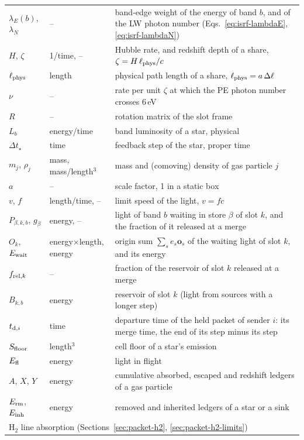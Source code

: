 \begin{longtable}{p{1.9cm}p{3.4cm}p{8.6cm}}
$\lambda_E(b)$, $\lambda_N$ & -- & band-edge weight of the energy of band $b$, and of the LW photon number (Eqs.~\eqref{eq:isrf-lambdaE}, \eqref{eq:isrf-lambdaN}) \\
$H$, $\zeta$ & 1/time, -- & Hubble rate, and redshift depth of a share, $\zeta=H\,\ell_{\rm phys}/c$ \\
$\ell_{\rm phys}$ & length & physical path length of a share, $\ell_{\rm phys}=a\,\Delta\ell$ \\
$\nu$ & -- & rate per unit $\zeta$ at which the PE photon number crosses $6$\,eV \\
$R$ & -- & rotation matrix of the slot frame \\
$L_b$ & energy/time & band luminosity of a star, physical \\
$\Delta t_\star$ & time & feedback step of the star, proper time \\
$m_j$, $\rho_j$ & mass, mass/length$^3$ & mass and (comoving) density of gas particle $j$ \\
$a$ & -- & scale factor, 1 in a static box \\
$v$, $f$ & length/time, -- & limit speed of the light, $v=fc$ \\
$P_{\beta,k,b}$, $g_\beta$ & energy, -- & light of band $b$ waiting in store $\beta$ of slot $k$, and the fraction of it released at a merge \\
$O_k$, $E_{\rm wait}$ & energy$\times$length, energy & origin sum $\sum_s e_s\boldsymbol{o}_s$ of the waiting light of slot $k$, and its energy \\
$f_{{\rm rel},k}$ & -- & fraction of the reservoir of slot $k$ released at a merge \\
$B_{k,b}$ & energy & reservoir of slot $k$ (light from sources with a longer step) \\
$t_{{\rm d},i}$ & time & departure time of the held packet of sender $i$: its merge time, the end of its step minus its step \\
$S_{\rm floor}$ & length$^3$ & cell floor of a star's emission \\
$E_{\rm fl}$ & energy & light in flight \\
$A$, $X$, $Y$ & energy & cumulative absorbed, escaped and redshift ledgers of a gas particle \\
$E_{\rm rm}$, $E_{\rm inh}$ & energy & removed and inherited ledgers of a star or a sink \\
\midrule
\multicolumn{3}{l}{H$_2$ line absorption (Sections~\ref{sec:packet-h2}, \ref{sec:packet-h2-limits})} \\

\end{longtable}
